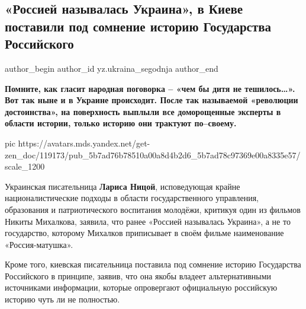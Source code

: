  
 
 
 
 
 
\subsection{«Россией называлась Украина», в Киеве поставили под сомнение историю Государства Российского}
\label{sec:20_08_2018.sites.ru.zen_yandex.yz.ukraina_segodnja.1.rossiei_nazyvalas_ukraina}
\ifcmt
	author_begin
   author_id yz.ukraina_segodnja
	author_end
\fi


\textbf{Помните, как гласит народная поговорка – «чем бы дитя не тешилось…». Вот так
ныне и в Украине происходит. После так называемой «революции достоинства», на
поверхность выплыли все доморощенные эксперты в области истории, только историю
они трактуют по–своему.}

\ifcmt
pic https://avatars.mds.yandex.net/get-zen_doc/119173/pub_5b7ad76b78510a00a8d4b2d6_5b7ad78c97369e00a8335e57/scale_1200
\fi

Украинская писательница \textbf{Лариса Ницой}, исповедующая крайне националистические
подходы в области государственного управления, образования и патриотического
воспитания молодёжи, критикуя один из фильмов Никиты Михалкова, заявила, что
ранее «Россией называлась Украина», а не то государство, которому Михалков
приписывает в своём фильме наименование «Россия-матушка».

Кроме того, киевская писательница поставила под сомнение историю Государства
Российского в принципе, заявив, что она якобы владеет альтернативными
источниками информации, которые опровергают официальную российскую историю чуть
ли не полностью.

